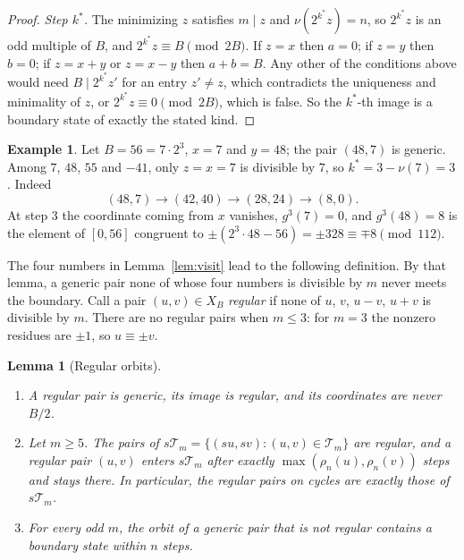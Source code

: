 \documentclass[11pt]{amsart}
\newtheorem{lemma}[theorem]{Lemma}
\theoremstyle{definition}
\newtheorem*{example}{Example}
\theoremstyle{remark}
\newcommand{\T}{\mathcal{T}}
\newcommand{\vt}{\nu}
\begin{document}
\begin{proof}
\emph{Step $k^*$.} The minimizing $z$ satisfies $m\mid z$ and $\vt(2^{k^*}z)=n$, so $2^{k^*}z$ is an odd multiple of $B$, and $2^{k^*}z\equiv B\pmod{2B}$. If $z=x$ then $a=0$; if $z=y$ then $b=0$; if $z=x+y$ or $z=x-y$ then $a+b=B$. Any other of the conditions above would need $B\mid2^{k^*}z'$ for an entry $z'\ne z$, which contradicts the uniqueness and minimality of $z$, or $2^{k^*}z\equiv0\pmod{2B}$, which is false. So the $k^*$-th image is a boundary state of exactly the stated kind.
\end{proof}

\begin{example}
Let $B=56=7\cdot2^3$, $x=7$ and $y=48$; the pair $(48,7)$ is generic. Among $7$, $48$, $55$ and $-41$, only $z=x=7$ is divisible by $7$, so $k^*=3-\vt(7)=3$. Indeed
\[
(48,7)\to(42,40)\to(28,24)\to(8,0).
\]
At step $3$ the coordinate coming from $x$ vanishes, $g^3(7)=0$, and $g^3(48)=8$ is the element of $[0,56]$ congruent to $\pm(2^3\cdot48-56)=\pm328\equiv\mp8\pmod{112}$.
\end{example}

The four numbers in Lemma~\ref{lem:visit} lead to the following definition. By that lemma, a generic pair none of whose four numbers is divisible by $m$ never meets the boundary. Call a pair $(u,v)\in X_B$ \emph{regular} if none of $u$, $v$, $u-v$, $u+v$ is divisible by $m$. There are no regular pairs when $m\le3$: for $m=3$ the nonzero residues are $\pm1$, so $u\equiv\pm v$.

\begin{lemma}[Regular orbits]\label{lem:regular}
\begin{enumerate}
\item[(a)] A regular pair is generic, its image is regular, and its coordinates are never $B/2$.
\item[(b)] Let $m\ge5$. The pairs of $s\T_m=\{(su,sv):(u,v)\in\T_m\}$ are regular, and a regular pair $(u,v)$ enters $s\T_m$ after exactly $\max(\rho_n(u),\rho_n(v))$ steps and stays there. In particular, the regular pairs on cycles are exactly those of $s\T_m$.
\item[(c)] For every odd $m$, the orbit of a generic pair that is not regular contains a boundary state within $n$ steps.
\end{enumerate}
\end{lemma}
\end{document}
